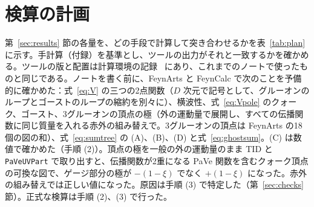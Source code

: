\documentclass[a4paper,10pt]{ltjsarticle}
\begin{document}
\section{検算の計画}\label{sec:plan}

第~\ref{sec:results} 節の各量を、どの手段で計算して突き合わせるかを表~\ref{tab:plan} に示す。手計算（付録）を基準とし、ツールの出力がそれと一致するかを確かめる。ツールの版と配置は計算環境の記録~\cite{env} にあり、これまでのノートで使ったものと同じである。ノートを書く前に、FeynArts と FeynCalc で次のことを予備的に確かめた：式~\eqref{eq:V} の三つの2点関数（$D$ 次元で記号として、グルーオンのループとゴーストのループの縮約を別々に）、横波性、式~\eqref{eq:Vpole} のクォーク、ゴースト、3グルーオンの頂点の極（外の運動量で展開し、すべての伝播関数に同じ質量を入れる赤外の組み替えで。3グルーオンの頂点は FeynArts の18個の図の和）、式~\eqref{eq:sumtree} の (A)、(B)、(D) と式~\eqref{eq:ghostsum}。(C) は数値で確かめた（手順 (2)）。頂点の極を一般の外の運動量のまま TID と \texttt{PaVeUVPart} で取り出すと、伝播関数が2重になる PaVe 関数を含むクォーク頂点の可換な図で、ゲージ部分の極が $-(1-\xi)$ でなく $+(1-\xi)$ になった。赤外の組み替えでは正しい値になった。原因は手順 (3) で特定した（第~\ref{sec:checks} 節）。正式な検算は手順 (2)、(3) で行った。
\end{document}
